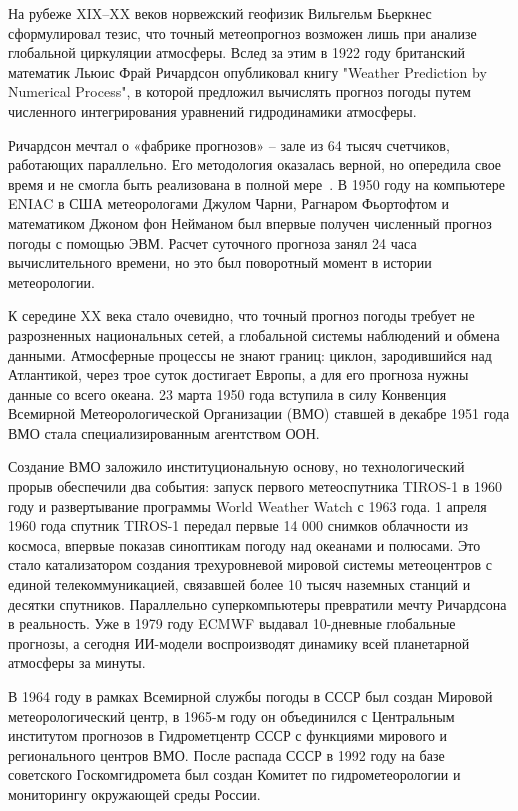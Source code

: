 На рубеже XIX–XX веков норвежский геофизик Вильгельм Бьеркнес  сформулировал тезис, что точный метеопрогноз возможен лишь при анализе глобальной циркуляции атмосферы.
Вслед за этим в 1922 году британский математик Льюис Фрай Ричардсон опубликовал книгу "Weather Prediction by Numerical Process", в которой предложил вычислять прогноз погоды путем численного интегрирования уравнений гидродинамики атмосферы. 

Ричардсон мечтал о «фабрике прогнозов» -- зале из 64 тысяч счетчиков, работающих параллельно.
Его методология оказалась верной, но опередила свое время и не смогла быть реализована в полной мере~\cite{Kimura2002NumericalWeatherPrediction}.
В 1950 году на компьютере ENIAC в США метеорологами Джулом Чарни, Рагнаром Фьортофтом и математиком Джоном фон Нейманом был впервые получен численный прогноз погоды с помощью ЭВМ. 
Расчет суточного прогноза занял 24 часа вычислительного времени, но это был поворотный момент в истории метеорологии. 

К середине XX века стало очевидно, что точный прогноз погоды требует не разрозненных национальных сетей, а глобальной системы наблюдений и обмена данными. 
Атмосферные процессы не знают границ: циклон, зародившийся над Атлантикой, через трое суток достигает Европы, а для его прогноза нужны данные со всего океана. 
23 марта 1950 года вступила в силу Конвенция Всемирной Метеорологической Организации (ВМО) ставшей в декабре 1951 года ВМО стала специализированным агентством ООН.

Создание ВМО заложило институциональную основу, но технологический прорыв обеспечили два события: запуск первого метеоспутника TIROS-1 в 1960 году и развертывание программы World Weather Watch с 1963 года.
1 апреля 1960 года спутник TIROS-1 передал первые 14 000 снимков облачности из космоса, впервые показав синоптикам погоду над океанами и полюсами. 
Это стало катализатором создания трехуровневой мировой системы метеоцентров с единой телекоммуникацией, связавшей более 10 тысяч наземных станций и десятки спутников. 
Параллельно суперкомпьютеры превратили мечту Ричардсона в реальность.
Уже в 1979 году ECMWF выдавал 10-дневные глобальные прогнозы, а сегодня ИИ-модели воспроизводят динамику всей планетарной атмосферы за минуты.

В 1964 году в рамках Всемирной службы погоды в СССР был создан Мировой метеорологический центр, в 1965-м году он объединился с Центральным институтом прогнозов в Гидрометцентр СССР с функциями мирового и регионального центров ВМО. 
После распада СССР в 1992 году на базе советского Госкомгидромета был создан Комитет по гидрометеорологии и мониторингу окружающей среды России.

